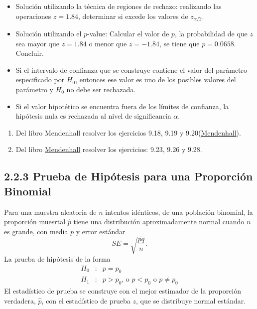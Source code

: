 \begin{frame}
\begin{frame}
\begin{Sol}
\begin{itemize}
\item Soluci\'on utilizando la t\'ecnica de regiones de rechazo:\medskip
realizando las operaciones
$z=1.84$, determinar si excede los valores de $z_{\alpha/2}$.
\item Soluci\'on utilizando el $p$-value:\medskip
Calcular el valor de $p$, la probabilidad de que $z$ sea mayor que $z=1.84$ o menor que $z=-1.84$, se tiene que $p=0.0658$. Concluir.
\end{itemize}
\end{Sol}







\begin{itemize}
\item Si el intervalo de confianza que se construye contiene el valor del par\'ametro especificado por $H_{0}$, entonces ese valor es uno de los posibles valores del par\'ametro y $H_{0}$ no debe ser rechazada.

\item Si el valor hipot\'etico se encuentra fuera de los l\'imites de confianza, la hip\'otesis nula es rechazada al nivel de significancia $\alpha$.
\end{itemize}

\begin{enumerate}
\item Del libro Mendenhall resolver los ejercicios 9.18, 9.19 y 9.20(\href{https://cu.uacm.edu.mx/nextcloud/index.php/f/202873}{Mendenhall}).

\item Del libro \href{https://cu.uacm.edu.mx/nextcloud/index.php/f/202873}{Mendenhall} resolver los ejercicios: 9.23, 9.26 y 9.28.
\end{enumerate}







\subsection{2.2.3 Prueba de Hip\'otesis para una Proporci\'on Binomial}




Para una muestra aleatoria de $n$ intentos id\'enticos, de una poblaci\'on binomial, la proporci\'on muesrtal $\hat{p}$ tiene una distribuci\'on aproximadamente normal cuando $n$ es grande, con media $p$ y error est\'andar
$$SE=\sqrt{\frac{pq}{n}}.$$
La prueba de hip\'otesis de la forma
\begin{eqnarray*}
H_{0}&:&p=p_{0}\\
H_{1}&:&p>p_{0}\textrm{, o }p<p_{0}\textrm{ o }p\neq p_{0}
\end{eqnarray*}
El estad\'istico de prueba se construye con el mejor estimador de la proporci\'on verdadera, $\hat{p}$, con el estad\'istico de prueba $z$, que se distribuye normal est\'andar.


\end{frame}
\end{frame}
